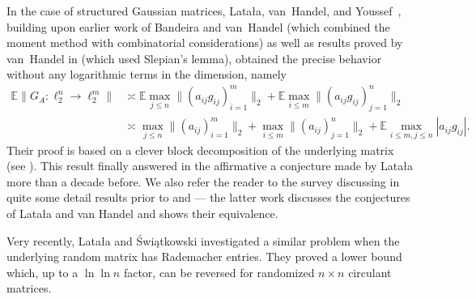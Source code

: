 \documentclass[a4paper]{amsart}
\theoremstyle{definition}
\theoremstyle{remark}
\numberwithin{equation}{section}
\newcommand*{\EE}{\mathbb{E}}
\begin{document}
In the case of structured Gaussian matrices, Lata{\l}a, van~Handel, and Youssef~\cite{LvHY}, building upon earlier work of Bandeira and van~Handel \cite{BvH2016} (which combined the moment method with combinatorial considerations) as well as results proved by van~Handel in \cite{vH2017} (which used  Slepian's lemma),
obtained the precise behavior without any logarithmic terms in the dimension, namely
  \begin{align}
 	\label{eq:LvHY}
 	\EE \| G_A \colon \ell_{2}^n\to\ell_2^m\|
 	& \asymp
 \EE \max_{j \leq n} \|(a_{ij} g_{ij})_{i=1}^m\|_2
 + \EE \max_{i \leq m}\|(a_{ij} g_{ij})_{j=1}^n\|_{2}  \\ \nonumber
 & \asymp \max_{j \leq n} \|(a_{ij})_{i=1}^m\|_2
  + \max_{i \leq m}\|(a_{ij})_{j=1}^n\|_{2} + \EE\max_{i\leq m, j\leq n}|a_{ij}g_{ij}| .
\end{align}
Their proof is based on a clever block decomposition of the underlying matrix (see \cite[Figure 3.1]{LvHY}). This result finally answered in the affirmative a conjecture made by Lata{\l}a more than a decade before. We also refer the reader to the survey \cite{vH2017_survey} discussing in quite some detail results prior to \cite{LvHY} and \cite{vH2017} --- the latter work discusses the conjectures of Lata{\l}a and van Handel and shows their equivalence.

Very recently, Lata\l{}a and \'Swi\k{a}tkowski \cite{latala-swiatkowski2021norms} investigated a similar problem when the underlying random matrix has Rademacher entries.
They proved a lower bound which, up to a $\ln \ln n$ factor, can be reversed  for randomized $n\times n$ circulant  matrices.
\end{document}
